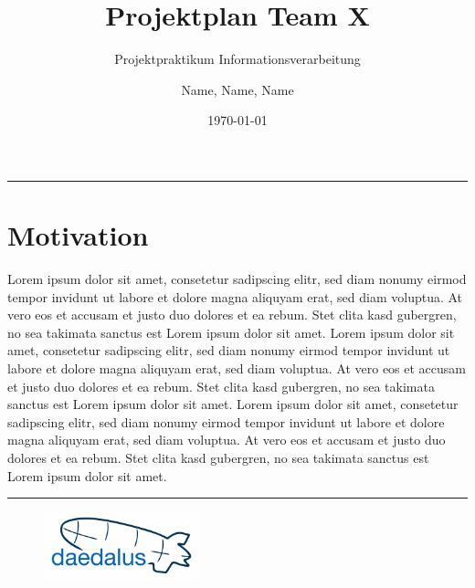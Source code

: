 \documentclass[lang=ngerman,inputenc=utf8,fontsize=10pt]{ldvarticle}
\title{Projektplan Team X}
\subtitle{Projektpraktikum Informationsverarbeitung}
\author{Name, Name, Name}
\date{\today}
\begin{document}
	\maketitle	
	\thispagestyle{empty}
\vspace*{2cm}


\hrule

\section*{Motivation}

Lorem ipsum dolor sit amet, consetetur sadipscing elitr, sed diam nonumy eirmod tempor invidunt ut labore et dolore magna aliquyam erat, sed diam voluptua. At vero eos et accusam et justo duo dolores et ea rebum. Stet clita kasd gubergren, no sea takimata sanctus est Lorem ipsum dolor sit amet. Lorem ipsum dolor sit amet, consetetur sadipscing elitr, sed diam nonumy eirmod tempor invidunt ut labore et dolore magna aliquyam erat, sed diam voluptua. At vero eos et accusam et justo duo dolores et ea rebum. Stet clita kasd gubergren, no sea takimata sanctus est Lorem ipsum dolor sit amet. Lorem ipsum dolor sit amet, consetetur sadipscing elitr, sed diam nonumy eirmod tempor invidunt ut labore et dolore magna aliquyam erat, sed diam voluptua. At vero eos et accusam et justo duo dolores et ea rebum. Stet clita kasd gubergren, no sea takimata sanctus est Lorem ipsum dolor sit amet.   




\vspace*{1cm}
\hrule


\begin{figure}[!b]
\centering
\includegraphics[width=0.4\textwidth]{logo_kl.png}
\end{figure}

\newpage

\end{document}
